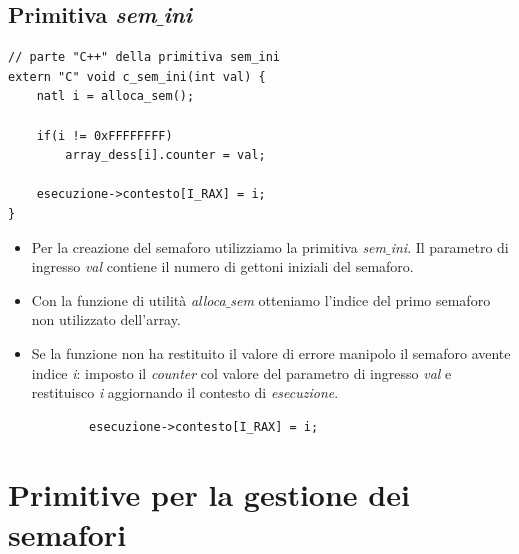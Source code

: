\documentclass[11pt]{report}
\theoremstyle{definition}
\begin{document}
\subsection{Primitiva \emph{sem$\_$ini}}
\small 
\begin{verbatim}
// parte "C++" della primitiva sem_ini
extern "C" void c_sem_ini(int val) {
    natl i = alloca_sem();
    
    if(i != 0xFFFFFFFF)
        array_dess[i].counter = val;
    
    esecuzione->contesto[I_RAX] = i;
}
\end{verbatim}
\normalsize 
\begin{itemize}
	\item Per la creazione del semaforo utilizziamo la primitiva \emph{sem$\_$ini}. Il parametro di ingresso  \emph{val} contiene il numero di gettoni iniziali del semaforo.
	\item Con la funzione di utilità \emph{alloca$\_$sem} otteniamo l'indice del primo semaforo non utilizzato dell'array.
	\item Se la funzione non ha restituito il valore di errore manipolo il semaforo avente indice \emph{i}: imposto il \emph{counter} col valore del parametro di ingresso \emph{val} e restituisco \emph{i} aggiornando il contesto di \emph{esecuzione}.
	\begin{verbatim}
		esecuzione->contesto[I_RAX] = i;
	\end{verbatim}
\end{itemize}

\section{Primitive per la gestione dei semafori}
\end{document}
